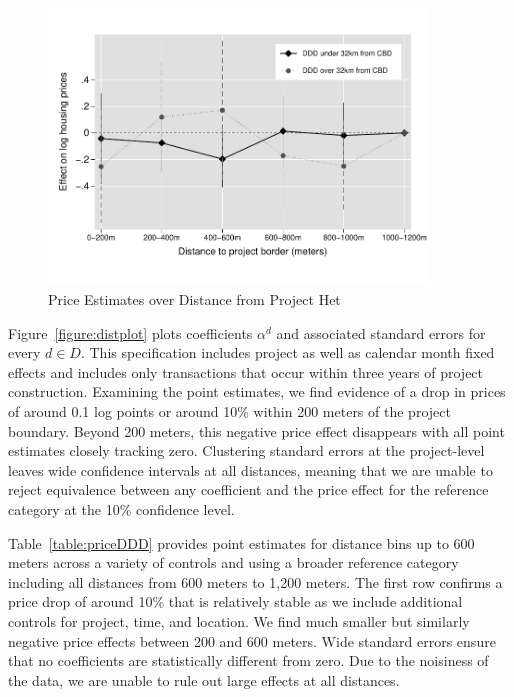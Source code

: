 \documentclass[12pt]{article}
\begin{document}
\begin{figure}[b!]
\caption{Price Estimates over Distance from Project Het}\label{figure:distplot_het}
\centering
\includegraphics[width=0.9\textwidth,trim={0cm .7cm 0cm 0.7cm},clip=true]{figures/price_regs_DDDplot_het}
\vspace{-2mm}
\end{figure}


Figure~\ref{figure:distplot} plots coefficients $\alpha^d$ and associated standard errors for every $d\in D$. This specification includes project as well as calendar month fixed effects and includes only transactions that occur within three years of project construction.  Examining the point estimates, we find evidence of a drop in prices of around 0.1 log points or around 10\% within 200 meters of the project boundary.  Beyond 200 meters, this negative price effect disappears with all point estimates closely tracking zero.  Clustering standard errors at the project-level leaves wide confidence intervals at all distances, meaning that we are unable to reject equivalence between any coefficient and the price effect for the reference category at the 10\% confidence level.

Table~\ref{table:priceDDD} provides point estimates for distance bins up to 600 meters across a variety of controls and using a broader reference category including all distances from 600 meters to 1,200 meters.  The first row confirms a price drop of around 10\% that is relatively stable as we include additional controls for project, time, and location.  We find much smaller but similarly negative price effects between 200 and 600 meters.  Wide standard errors ensure that no coefficients are statistically different from zero. Due to the noisiness of the data, we are unable to rule out large effects at all distances. 
\end{document}
